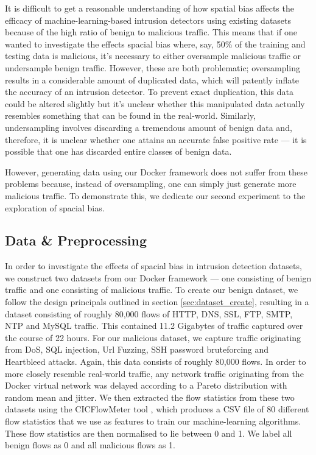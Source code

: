 \documentclass[msc,deptreport, cs]{infthesis} %
\begin{document}
It is difficult to get a reasonable understanding of how spatial bias affects the efficacy of machine-learning-based intrusion detectors using existing datasets because of the high ratio of benign to malicious traffic. This means that if one wanted to investigate the effects spacial bias where, say, 50\%  of the training and testing data is malicious, it's necessary to either oversample malicious traffic or undersample benign traffic. However, these are both problematic; oversampling results in a considerable amount of duplicated data, which will patently inflate the accuracy of an intrusion detector. To prevent exact duplication, this data could be altered slightly but it's unclear whether this manipulated data actually resembles something that can be found in the real-world. Similarly, undersampling involves discarding a tremendous amount of benign data and, therefore, it is unclear whether one attains an accurate false positive rate --- it is possible that one has discarded entire classes of benign data.

However, generating data using our Docker framework does not suffer from these problems because, instead of oversampling, one can simply just generate more malicious traffic. To demonstrate this, we dedicate our second experiment to the exploration of spacial bias.

\subsection{Data \& Preprocessing}

In order to investigate the effects of spacial bias in intrusion detection datasets, we construct two datasets from our Docker framework --- one consisting of benign traffic and one consisting of malicious traffic. To create our benign dataset, we follow the design principals outlined in section \ref{sec:dataset_create}, resulting in a dataset consisting of roughly 80,000 flows of HTTP, DNS, SSL, FTP, SMTP, NTP and MySQL traffic. This contained 11.2 Gigabytes of traffic captured over the course of 22 hours. For our malicious dataset, we capture traffic originating from DoS, SQL injection, Url Fuzzing, SSH password bruteforcing and Heartbleed attacks. Again, this data consists of roughly 80,000 flows. In order to more closely resemble real-world traffic, any network traffic originating from the Docker virtual network was delayed according to a Pareto distribution with random mean and jitter. We then extracted the flow statistics from these two datasets using the CICFlowMeter tool \cite{netflowmeter}, which produces a CSV file of 80 different flow statistics that we use as features to train our machine-learning algorithms. These flow statistics are then normalised to lie between 0 and 1. We label all benign flows as 0 and all malicious flows as 1.
\end{document}
